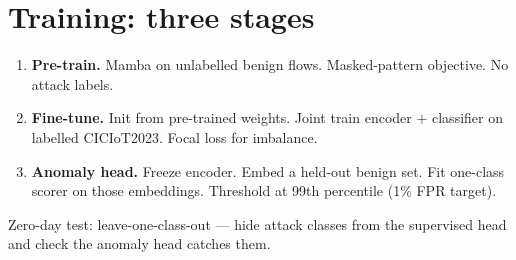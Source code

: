 \documentclass[11pt,a4paper]{article}
\begin{document}
\section{Training: three stages}
\begin{enumerate}[leftmargin=*, itemsep=1pt, topsep=2pt]
  \item \textbf{Pre-train.} Mamba on unlabelled benign flows. Masked-pattern objective. No attack labels.
  \item \textbf{Fine-tune.} Init from pre-trained weights. Joint train encoder + classifier on labelled CICIoT2023. Focal loss for imbalance.
  \item \textbf{Anomaly head.} Freeze encoder. Embed a held-out benign set. Fit one-class scorer on those embeddings. Threshold at 99th percentile (1\% FPR target).
\end{enumerate}

Zero-day test: leave-one-class-out --- hide attack classes from the supervised head and check the anomaly head catches them.
\end{document}
